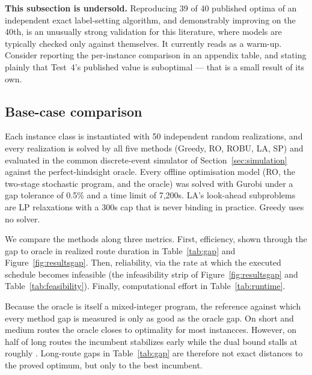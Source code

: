\begin{acmt}
\textbf{This subsection is undersold.} Reproducing 39 of 40 published optima of an
independent exact label-setting algorithm, and demonstrably improving on the
40th, is an unusually strong validation for this literature, where models are
typically checked only against themselves. It currently reads as a warm-up.
Consider reporting the per-instance comparison in an appendix table, and stating
plainly that Test~4's published value is suboptimal --- that is a small result of
its own.
\end{acmt}

\subsection{Base-case comparison}
\label{sec:basecase}

Each instance class is instantiated with 50 independent random realizations, and every realization is solved by all five methods (Greedy, RO, ROBU, LA, SP) and evaluated in the common discrete-event simulator of Section~\ref{sec:simulation} against the perfect-hindsight oracle.
Every offline optimisation model (RO,  the two-stage stochastic program, and the oracle) was solved with Gurobi under a gap tolerance of 0.5\% and a time limit of 7,200s. LA's look-ahead subproblems are LP relaxations with a 300s cap that is never binding in practice. Greedy uses no solver.

We compare the methods along three metrics. First, efficiency, shown through the gap to oracle in realized route duration in Table~\ref{tab:gap} and Figure~\ref{fig:resultsgap}. Then, reliability, via the rate at which the executed schedule becomes infeasible (the infeasibility strip of Figure~\ref{fig:resultsgap} and Table~\ref{tab:feasibility}). Finally, computational effort in Table~\ref{tab:runtime}.

Because the oracle is itself a mixed-integer program, the reference against which every method gap is measured is only as good as the oracle gap. On short and medium routes the oracle closes to optimality for most instancces. However, on half of long routes the incumbent stabilizes early while the dual bound stalls at roughly . Long-route gaps in Table~\ref{tab:gap} are therefore not exact distances to the proved optimum, but only to the best incumbent.



